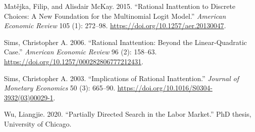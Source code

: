 \documentclass[
  letterpaper,
  DIV=11,
  numbers=noendperiod]{scrreprt}
\newlength{\cslhangindent}
\newlength{\cslentryspacingunit} %
\newenvironment{CSLReferences}[2] %
 {%
  \setlength{\parindent}{0pt}
  \ifodd #1
  \let\oldpar\par
  \def\par{\hangindent=\cslhangindent\oldpar}
  \fi
  \setlength{\parskip}{#2\cslentryspacingunit}
 }%
 {}
\begin{document}
\begin{CSLReferences}{1}{0}
\leavevmode{}%
Matějka, Filip, and Alisdair McKay. 2015. {``Rational {Inattention} to
{Discrete Choices}: {A New Foundation} for the {Multinomial Logit
Model}.''} \emph{American Economic Review} 105 (1): 272--98.
\url{https://doi.org/10.1257/aer.20130047}.

\leavevmode{}%
Sims, Christopher A. 2006. {``Rational {Inattention}: {Beyond} the
{Linear-Quadratic Case}.''} \emph{American Economic Review} 96 (2):
158--63. \url{https://doi.org/10.1257/000282806777212431}.

\leavevmode{}%
Sims, Christopher A. 2003. {``Implications of Rational Inattention.''}
\emph{Journal of Monetary Economics} 50 (3): 665--90.
\url{https://doi.org/10.1016/S0304-3932(03)00029-1}.

\leavevmode{}%
Wu, Liangjie. 2020. {``Partially {Directed Search} in the {Labor
Market}.''} PhD thesis, University of Chicago.

\end{CSLReferences}
\end{document}

